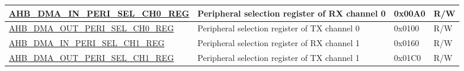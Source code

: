 \begin{longtable}{ | p{8cm} | p{8cm} | p{1.3cm} | p{1.5cm} | }
\hyperref[regdesc:AHBDMAINPERISELCHNREG]{AHB\_DMA\_IN\_PERI\_SEL\_CH0\_REG} & Peripheral selection register of RX channel 0 & 0x00A0 & R/W \\ \hline
\hyperref[regdesc:AHBDMAOUTPERISELCHNREG]{AHB\_DMA\_OUT\_PERI\_SEL\_CH0\_REG} & Peripheral selection register of TX channel 0 & 0x0100 & R/W \\ \hline
\hyperref[regdesc:AHBDMAINPERISELCHNREG]{AHB\_DMA\_IN\_PERI\_SEL\_CH1\_REG} & Peripheral selection register of RX channel 1 & 0x0160 & R/W \\ \hline
\hyperref[regdesc:AHBDMAOUTPERISELCHNREG]{AHB\_DMA\_OUT\_PERI\_SEL\_CH1\_REG} & Peripheral selection register of TX channel 1 & 0x01C0 & R/W \\ \hline
\end{longtable}
